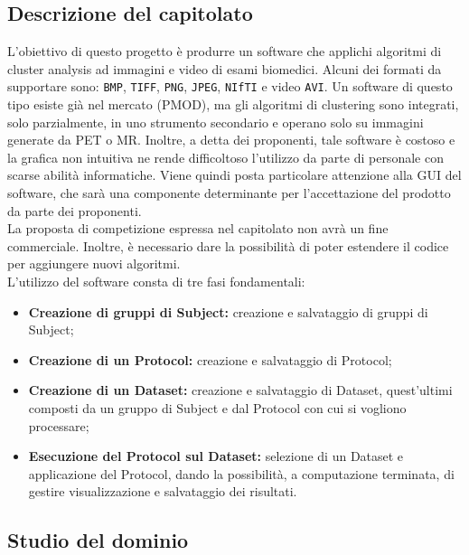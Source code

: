 \subsection{Descrizione del capitolato}
\label{descrizionecap3}
L'obiettivo di questo progetto è produrre un software che applichi algoritmi di cluster analysis\glossario{} ad immagini e video di esami biomedici. Alcuni dei formati da supportare sono: 
\verb!BMP!\glossario{}, \verb!TIFF!\glossario{}, \verb!PNG!\glossario{}, \verb!JPEG!\glossario{}, \verb!NIfTI!\glossario{} e video \verb!AVI!\glossario{}. 
Un software di questo tipo esiste già nel mercato (PMOD\glossario{}), ma gli algoritmi di clustering\glossario{} sono integrati, solo parzialmente, in uno strumento secondario e operano solo su immagini generate da PET\glossario{} o MR\glossario{}. Inoltre, a detta dei proponenti, tale software è costoso e la grafica non intuitiva ne rende difficoltoso l'utilizzo da parte di personale con scarse abilità informatiche. Viene quindi posta particolare attenzione alla GUI\glossario{} del software, che sarà una componente determinante per l'accettazione del prodotto da parte dei proponenti.
\\ La proposta di competizione espressa nel capitolato non avrà un fine commerciale. Inoltre, è necessario dare la possibilità di poter estendere il codice per aggiungere nuovi algoritmi.
\\ L'utilizzo del software consta di tre fasi fondamentali:
\begin{itemize}
\item\textbf{Creazione di gruppi di Subject:} creazione e salvataggio di gruppi di Subject\glossario;
\item\textbf{Creazione di un Protocol:} creazione e salvataggio di Protocol\glossario;
\item\textbf{Creazione di un Dataset:} creazione e salvataggio di Dataset\glossario{}, quest'ultimi composti da un gruppo di Subject\glossario{} e dal Protocol\glossario{} con cui si vogliono processare;
\item\textbf{Esecuzione del Protocol sul Dataset:} selezione di un Dataset\glossario{} e applicazione del Protocol\glossario{}, dando la possibilità, a computazione terminata, di gestire visualizzazione e salvataggio dei risultati.
\end{itemize}

\subsection{Studio del dominio}
\label{dominiocap3}
